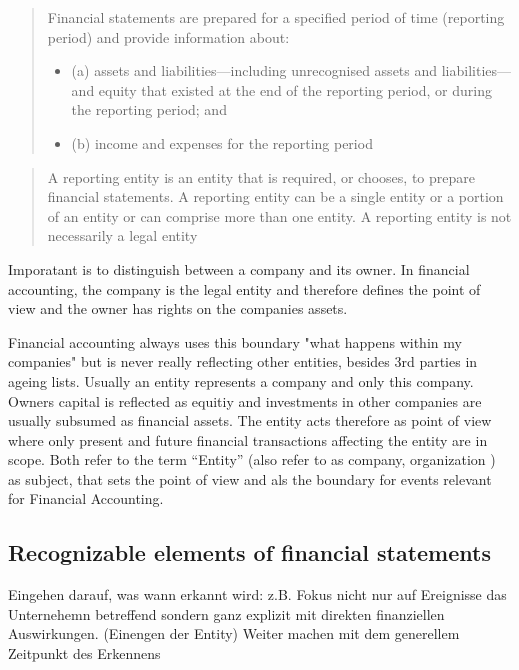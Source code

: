 \cite{IASBFramwork} 

\blockcquote[3.4]{IASBFramwork}{Financial statements are prepared for a specified period of time (reporting period) and provide information about:
\begin{itemize}
	\item[] (a) assets and liabilities—including unrecognised assets and liabilities—
	and equity that existed at the end of the reporting period, or during
	the reporting period; and
	\item[] (b) income and expenses for the reporting period
\end{itemize}
}

\blockcquote[3.10]{IASBFramwork}{A reporting entity is an entity that is required, or chooses, to prepare financial statements. A reporting entity can be a single entity or a portion of an entity or can comprise more than one entity. A reporting entity is not necessarily a legal entity}

Imporatant is to distinguish between a company and its owner. In financial accounting, the company is the legal entity and therefore defines the point of view and the owner has rights on the companies assets.


Financial accounting always uses this boundary "what happens within my companies" but is never really reflecting other entities, besides 3rd parties in ageing lists.
Usually an entity represents a company and only this company.
Owners capital is reflected as equitiy and investments in other companies are usually subsumed as financial assets.
The entity acts therefore as point of view where only present and future financial transactions affecting the entity are in scope.
Both refer to the term \enquote{Entity} (also refer to as company, organization ) as subject, that sets the point of view and als the boundary for events relevant for Financial Accounting.

\subsection{Recognizable elements of financial statements}

Eingehen darauf, was wann erkannt wird: z.B. Fokus nicht nur auf Ereignisse das Unternehemn betreffend sondern ganz explizit mit direkten finanziellen Auswirkungen. (Einengen der Entity)
Weiter machen mit dem generellem Zeitpunkt des Erkennens

